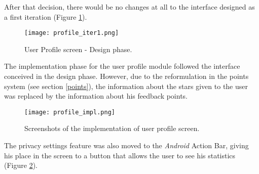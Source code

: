 After that decision, there would be no changes at all to the interface designed as a first iteration (Figure \ref{fig:profile_iter1}).

\begin{figure}[h!]
  \begin{center}
    \leavevmode
    \texttt{[image: profile\_iter1.png]}
    \caption{User Profile screen - Design phase.}
    \label{fig:profile_iter1}
  \end{center}
\end{figure}

The implementation phase for the user profile module followed the interface conceived in the design phase. However, due to the reformulation in the points system (see section \ref{points}), the information about the stars given to the user was replaced by the information about his feedback points.

\begin{figure}[h!]
  \begin{center}
    \leavevmode
    \texttt{[image: profile\_impl.png]}
    \caption{Screenshots of the implementation of user profile screen.}
    \label{fig:profile_impl}
  \end{center}
\end{figure}

The privacy settings feature was also moved to the \emph{Android} Action Bar, giving his place in the screen to a button that allows the user to see his statistics (Figure \ref{fig:profile_impl}).

